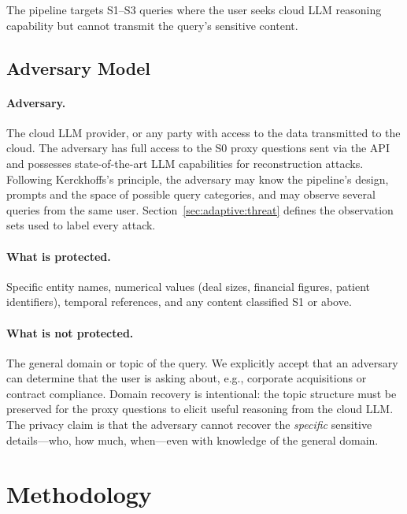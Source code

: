 \documentclass[sigconf,balance=false]{acmart}
\begin{document}
The pipeline targets S1--S3 queries where the user seeks cloud LLM reasoning capability but cannot transmit the query's sensitive content.

\subsection{Adversary Model}
\label{sec:adversary}

\paragraph{Adversary.} The cloud LLM provider, or any party with access to the data transmitted to the cloud. The adversary has full access to the S0 proxy questions sent via the API and possesses state-of-the-art LLM capabilities for reconstruction attacks. Following Kerckhoffs's principle, the adversary may know the pipeline's design, prompts and the space of possible query categories, and may observe several queries from the same user. Section~\ref{sec:adaptive:threat} defines the observation sets used to label every attack.

\paragraph{What is protected.} Specific entity names, numerical values (deal sizes, financial figures, patient identifiers), temporal references, and any content classified S1 or above.

\paragraph{What is not protected.} The general domain or topic of the query. We explicitly accept that an adversary can determine that the user is asking about, e.g., corporate acquisitions or contract compliance. Domain recovery is intentional: the topic structure must be preserved for the proxy questions to elicit useful reasoning from the cloud LLM. The privacy claim is that the adversary cannot recover the \emph{specific} sensitive details---who, how much, when---even with knowledge of the general domain.

\section{Methodology}
\label{sec:method}
\end{document}
